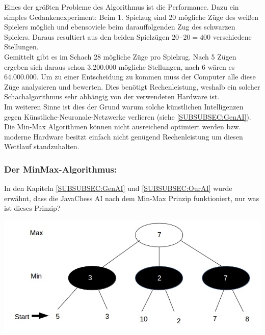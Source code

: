 \documentclass[12pt,a4paper]{article}
\begin{document}
{Eines der größten Probleme des Algorithmus ist die Performance. Dazu ein simples Gedankenexperiment: Beim 1. Spielzug sind 20 mögliche Züge des weißen Spielers möglich und ebensoviele beim darauffolgenden Zug des schwarzen Spielers. Daraus resultiert aus den beiden Spielzügen \(20 \cdot 20 = 400\) verschiedene Stellungen. \\
Gemittelt gibt es im Schach 28 mögliche Züge pro Spielzug. Nach 5 Zügen ergeben sich daraus schon 3.200.000 mögliche Stellungen, nach 6 wären es 64.000.000. Um zu einer Entscheidung zu kommen muss der Computer alle diese Züge analysieren und bewerten. Dies benötigt Rechenleistung, weshalb ein solcher Schachalgorithmus sehr abhängig von der verwendeten Hardware ist. \\
Im weiteren Sinne ist dies der Grund warum solche künstlichen Intelligenzen gegen Künstliche-Neuronale-Netzwerke verlieren (siehe \ref{SUBSUBSEC:GenAI}). Die Min-Max Algorithmen können nicht ausreichend optimiert werden bzw. moderne Hardware besitzt einfach nicht genügend Rechenleistung um diesen Wettlauf standzuhalten. \\

\subsubsection{Der MinMax-Algorithmus:}
\label{SUBSUBSEC:MinMax}

In den Kapiteln \ref{SUBSUBSEC:GenAI} und \ref{SUBSUBSEC:OurAI} wurde erwähnt, dass die JavaChess AI nach dem Min-Max Prinzip funktioniert, nur was ist dieses Prinzip?

\includegraphics[width=16cm]{graphics/MinMax.jpg}

}
\end{document}
